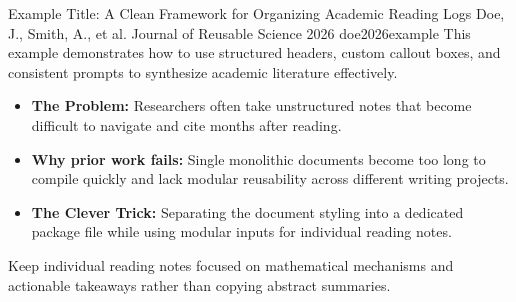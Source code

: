 
\begin{paperbox}
    {Example Title: A Clean Framework for Organizing Academic Reading Logs}
    {Doe, J., Smith, A., et al.}
    {Journal of Reusable Science 2026}
    {doe2026example}
    This example demonstrates how to use structured headers, custom callout boxes, and consistent prompts to synthesize academic literature effectively.
\end{paperbox}




\loggap
\begin{itemize}
    \item \textbf{The Problem:} Researchers often take unstructured notes that become difficult to navigate and cite months after reading.
    \item \textbf{Why prior work fails:} Single monolithic documents become too long to compile quickly and lack modular reusability across different writing projects.
\end{itemize}



\logmethod
\begin{itemize}
    \item \textbf{The Clever Trick:} Separating the document styling into a dedicated package file while using modular inputs for individual reading notes.
\end{itemize}

\begin{insightbox}
    Keep individual reading notes focused on mathematical mechanisms and actionable takeaways rather than copying abstract summaries.
\end{insightbox}



